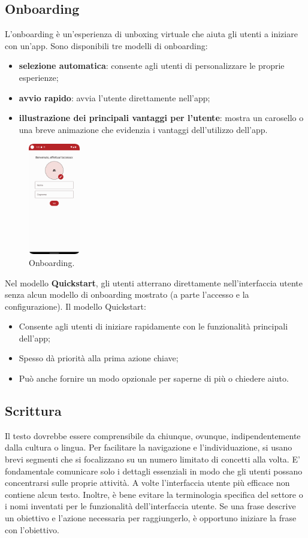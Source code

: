\documentclass[12pt, a4paper]{report}
\begin{document}
	\subsection{Onboarding}
	L'onboarding è un'esperienza di unboxing virtuale che aiuta gli utenti a iniziare con un'app. Sono disponibili tre modelli di onboarding:
	\begin{itemize}
		\item \textbf{selezione automatica}: consente agli utenti di personalizzare le proprie esperienze;
		\item  \textbf{avvio rapido}: avvia l'utente direttamente nell'app;
		\item  \textbf{illustrazione dei principali vantaggi per l'utente}: mostra un carosello o una breve animazione che evidenzia i vantaggi dell'utilizzo dell'app.
	\end{itemize}
\clearpage
	\begin{figure}[h]
		\centering
		\includegraphics[width=0.2\textwidth]{onboarding}
		\caption{Onboarding.}
	\end{figure}
	Nel modello \textbf{Quickstart}, gli utenti atterrano direttamente nell'interfaccia utente senza alcun modello di onboarding mostrato (a parte l'accesso e la configurazione). Il modello Quickstart:
	\begin{itemize}
		\item Consente agli utenti di iniziare rapidamente con le funzionalità principali dell'app;
		\item Spesso dà priorità alla prima azione chiave;
		\item Può anche fornire un modo opzionale per saperne di più o chiedere aiuto.
	\end{itemize}

	\subsection{Scrittura}
	Il testo dovrebbe essere comprensibile da chiunque, ovunque, indipendentemente dalla cultura o lingua. Per facilitare la navigazione e l'individuazione, si usano brevi segmenti che si focalizzano su un numero limitato di concetti alla volta. E’ fondamentale comunicare solo
	i dettagli essenziali in modo che gli utenti possano concentrarsi sulle proprie attività. A volte l'interfaccia utente più efficace non contiene alcun testo.  Inoltre, è bene evitare la terminologia specifica del settore o i nomi inventati per le funzionalità dell'interfaccia utente.
	Se una frase descrive un obiettivo e l'azione necessaria per raggiungerlo, è opportuno iniziare la frase con l'obiettivo.
\end{document}
